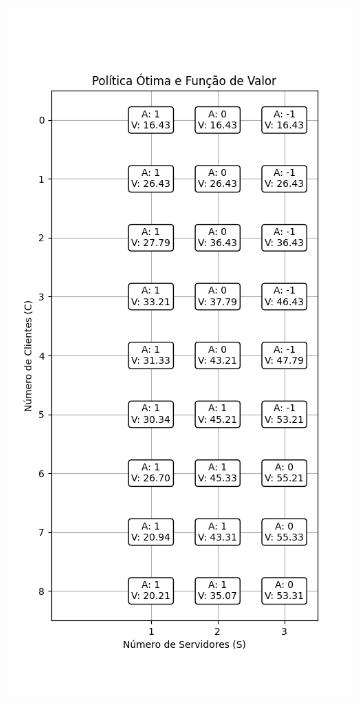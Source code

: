 \begin{figure}[H]
    \centering
    \begin{subfigure}{0.3\textwidth}
        \centering
        \includegraphics[width=\linewidth]{fig/value_iteration_policy_and_values.png}

\end{subfigure}
\end{figure}
